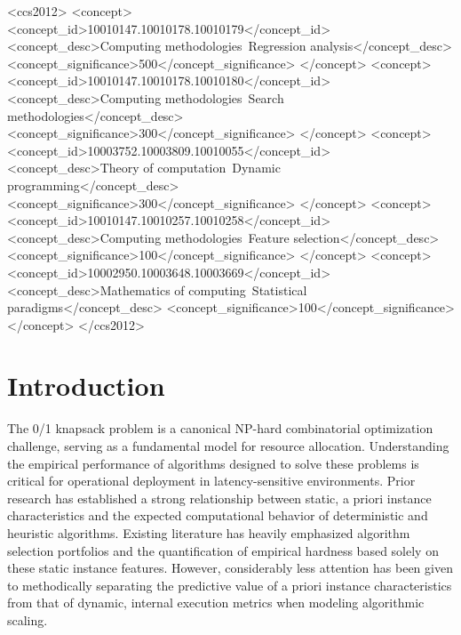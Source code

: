 \documentclass[sigconf]{acmart}
\begin{document}
\begin{CCSXML}
<ccs2012>
<concept>
<concept_id>10010147.10010178.10010179</concept_id>
<concept_desc>Computing methodologies~Regression analysis</concept_desc>
<concept_significance>500</concept_significance>
</concept>
<concept>
<concept_id>10010147.10010178.10010180</concept_id>
<concept_desc>Computing methodologies~Search methodologies</concept_desc>
<concept_significance>300</concept_significance>
</concept>
<concept>
<concept_id>10003752.10003809.10010055</concept_id>
<concept_desc>Theory of computation~Dynamic programming</concept_desc>
<concept_significance>300</concept_significance>
</concept>
<concept>
<concept_id>10010147.10010257.10010258</concept_id>
<concept_desc>Computing methodologies~Feature selection</concept_desc>
<concept_significance>100</concept_significance>
</concept>
<concept>
<concept_id>10002950.10003648.10003669</concept_id>
<concept_desc>Mathematics of computing~Statistical paradigms</concept_desc>
<concept_significance>100</concept_significance>
</concept>
</ccs2012>
\end{CCSXML}



\maketitle

\section{Introduction}

The 0/1 knapsack problem is a canonical NP-hard combinatorial optimization challenge, serving as a fundamental model for resource allocation. Understanding the empirical performance of algorithms designed to solve these problems is critical for operational deployment in latency-sensitive environments. Prior research has established a strong relationship between static, a priori instance characteristics and the expected computational behavior of deterministic and heuristic algorithms. Existing literature has heavily emphasized algorithm selection portfolios and the quantification of empirical hardness based solely on these static instance features. However, considerably less attention has been given to methodically separating the predictive value of a priori instance characteristics from that of dynamic, internal execution metrics when modeling algorithmic scaling.
\end{document}
